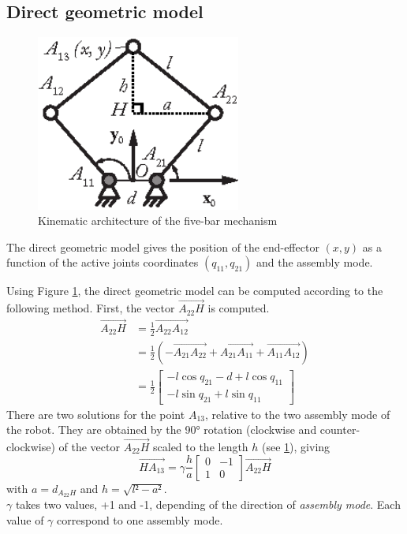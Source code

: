 \documentclass[a4paper]{article}
\begin{document}
\subsection{Direct geometric model}
\begin{figure}[h!]
\centering
\includegraphics[width=0.6\textwidth]{DGM5bar.eps}
\caption{Kinematic architecture of the five-bar mechanism}
\label{fig:DGM}
\end{figure}
The direct geometric model gives the position of the end-effector $(x, y)$ as a function of the active joints coordinates $(q_{11}, q_{21})$ and the assembly mode.

Using Figure \ref{fig:DGM}, the direct geometric model can be computed according to the following method. First, the vector $\overrightarrow{A_{22}H}$ is computed.
\begin{equation}
    \begin{aligned}
        \overrightarrow{A_{22}H} &= \frac{1}{2} \overrightarrow{A_{22}A_{12}}\\
        &= \frac{1}{2} (-\overrightarrow{A_{21}A_{22}} + \overrightarrow{A_{21}A_{11}} +\overrightarrow{A_{11}A_{12}})\\
        &= \frac{1}{2}\begin{bmatrix}
        -l\cos{q_{21}}-d+l\cos{q_{11}}\\
        -l\sin{q_{21}}+l\sin{q_{11}}
        \end{bmatrix}
    \end{aligned}
\end{equation}
There are two solutions for the point $A_{13}$, relative to the two assembly mode of the robot. They are obtained by the 90° rotation (clockwise and counter-clockwise) of the vector $\overrightarrow{A_{22}H}$ scaled to the length $h$ (see \ref{fig:DGM}), giving
%
\begin{equation}
\overrightarrow{HA_{13}}=\gamma\frac{h}{a}\begin{bmatrix}
0&-1\\1&0
\end{bmatrix}\overrightarrow{A_{22}H}
\end{equation}
%
with $a = d_{A_{22}H}$ and $h = \sqrt{l²-a²}$.\\
$\gamma$ takes two values, +1 and -1, depending of the direction of \textit{assembly mode}. Each value of $\gamma$ correspond to one assembly mode.
\end{document}
